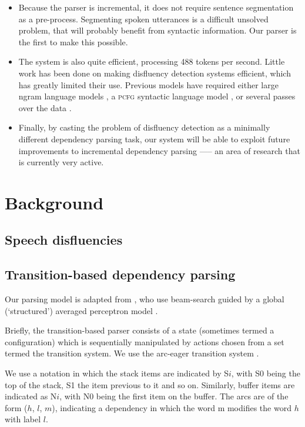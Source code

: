 \documentclass[11pt,letterpaper]{article}
\newcommand{\pcfg}{\textsc{pcfg}\xspace}
\begin{document}
\begin{itemize}
    \item Because the parser is incremental, it does not require sentence segmentation
        as a pre-process. Segmenting spoken utterances is a difficult unsolved
        problem, that will probably benefit from syntactic information. Our parser
        is the first to make this possible.

    \item The system is also quite efficient, processing 488 tokens per second.
        Little work has been done on making disfluency detection systems efficient,
        which has greatly limited their use. Previous models have required either
        large ngram language models \citep{zwarts:11}, a \pcfg syntactic language
        model \citep{Johnson04a}, or several passes over the data \citep{qian:13}.

    \item Finally, by casting the problem of disfluency detection as a minimally
           different dependency parsing task, our system will be able to exploit
           future improvements to incremental dependency parsing —-- an area of
           research that is currently very active.
\end{itemize}

\section{Background}

\subsection{Speech disfluencies}

\subsection{Transition-based dependency parsing}

Our parsing model is adapted from \citet{zhang:cl11}, who use beam-search guided
by a global (`structured') averaged perceptron model \citep{collins:02}.

Briefly, the transition-based parser consists of a state (sometimes termed a
configuration) which is sequentially manipulated by actions chosen from a set
termed the transition system. We use the arc-eager transition system
\citep{nivre:03,nivre:cl}.

We use a notation in which the stack items are indicated by S$i$, with S0 being
the top of the stack, S1 the item previous to it and so on. Similarly, buffer
items are indicated as N$i$, with N0 being the first item on the buffer. The arcs
are of the form ($h$, $l$, $m$), indicating a dependency in which the word m modifies
the word $h$ with label $l$.
\end{document}
